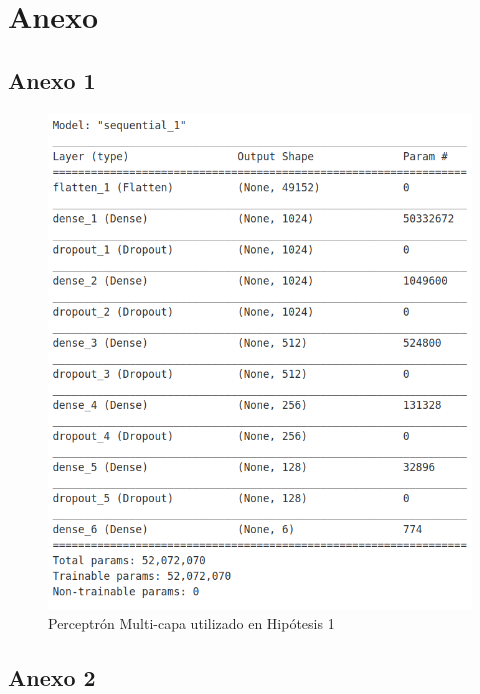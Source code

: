 \section{Anexo}\label{sec:anexo}

\subsection{Anexo 1}
\begin{figure}[h!]
	\centering
	\includegraphics[width=0.7\linewidth]{images/h1_mlp_model}
	\caption[Perceptrón Multi-capa utilizado en Hipótesis 1]{Perceptrón Multi-capa utilizado en Hipótesis 1}
	\label{fig:h1mlpmodel}
\end{figure}

\subsection{Anexo 2}\label{ssec:anexo2}

